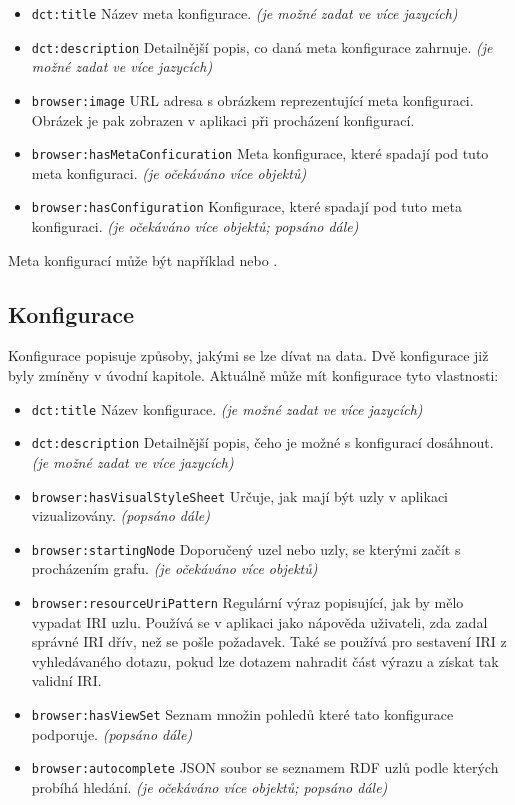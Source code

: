 \begin{itemize}
    \item \texttt{dct:title} Název meta konfigurace. \textit{(je možné zadat ve více jazycích)}
    \item \texttt{dct:description} Detailnější popis, co daná meta konfigurace zahrnuje. \textit{(je možné zadat ve více jazycích)}
    \item \texttt{browser:image} URL adresa s obrázkem reprezentující meta konfiguraci. Obrázek je pak zobrazen v aplikaci při procházení konfigurací.
    \item \texttt{browser:hasMetaConficuration} Meta konfigurace, které spadají pod tuto meta konfiguraci. \textit{(je očekáváno více objektů)}
    \item \texttt{browser:hasConfiguration} Konfigurace, které spadají pod tuto meta konfiguraci. \textit{(je očekáváno více objektů; popsáno dále)}
\end{itemize}

Meta konfigurací může být například  nebo .

\subsection{Konfigurace} \label{pozadavky-konfigurace}
Konfigurace popisuje způsoby, jakými se lze dívat na data. Dvě konfigurace již byly zmíněny v úvodní kapitole. Aktuálně může mít konfigurace tyto vlastnosti:

\begin{itemize}
    \item \texttt{dct:title} Název konfigurace. \textit{(je možné zadat ve více jazycích)}
    \item \texttt{dct:description} Detailnější popis, čeho je možné s konfigurací dosáhnout. \textit{(je možné zadat ve více jazycích)}
    \item \texttt{browser:hasVisualStyleSheet} Určuje, jak mají být uzly v aplikaci vizualizovány. \textit{(popsáno dále)}
    \item \texttt{browser:startingNode} Doporučený uzel nebo uzly, se kterými začít s procházením grafu. \textit{(je očekáváno více objektů)}
    \item \texttt{browser:resourceUriPattern} Regulární výraz popisující, jak by mělo vypadat IRI uzlu. Používá se v aplikaci jako nápověda uživateli, zda zadal správné IRI dřív, než se pošle požadavek. Také se používá pro sestavení IRI z vyhledávaného dotazu, pokud lze dotazem nahradit část výrazu a získat tak validní IRI.
    \item \texttt{browser:hasViewSet} Seznam množin pohledů které tato konfigurace podporuje. \textit{(popsáno dále)}
    \item \texttt{browser:autocomplete} JSON soubor se seznamem RDF uzlů podle kterých probíhá hledání. \textit{(je očekáváno více objektů; popsáno dále)}
\end{itemize}

